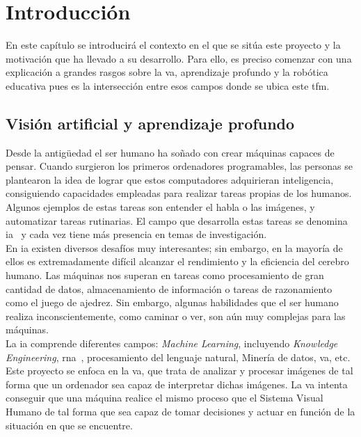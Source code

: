 \chapter{Introducción}\label{cap.introduccion}
En este capítulo se introducirá el contexto en el que se sitúa este proyecto y la motivación que ha llevado a su desarrollo. Para ello, es preciso comenzar con una
explicación a grandes rasgos sobre la \acrfull{va}, aprendizaje profundo y la robótica educativa pues es la intersección entre esos campos donde se ubica este \acrfull{tfm}.
\section{Visión artificial y aprendizaje profundo}

Desde la antigüedad el ser humano ha soñado con crear máquinas capaces de pensar. Cuando surgieron los primeros ordenadores programables, las personas se plantearon la idea de lograr que estos computadores adquirieran inteligencia, consiguiendo capacidades empleadas para realizar tareas propias de los humanos. Algunos ejemplos de estas tareas son entender el habla o las imágenes, y automatizar tareas rutinarias. El campo que desarrolla estas tareas se denomina \acrfull{ia}~\cite{Goodfellow} y cada vez tiene más presencia en temas de investigación.\\

En \acrshort{ia} existen diversos desafíos muy interesantes; sin embargo, en la mayoría de ellos es extremadamente difícil alcanzar el rendimiento y la eficiencia del cerebro humano. Las máquinas nos superan en tareas como procesamiento de gran cantidad de datos, almacenamiento de información o tareas de razonamiento como el juego de ajedrez. Sin embargo, algunas habilidades que el ser humano realiza inconscientemente, como caminar o ver, son aún muy complejas para las máquinas.\\

La \acrshort{ia} comprende diferentes campos: \textit{Machine Learning}, incluyendo \textit{Knowledge Engineering}, \acrfull{rna}~\cite{rna}, procesamiento del lenguaje natural, Minería de datos, \acrfull{va}, etc. Este proyecto se enfoca en la \acrshort{va}, que trata de analizar y procesar imágenes de tal forma que un ordenador sea capaz de interpretar dichas imágenes. La \acrshort{va} intenta conseguir que una máquina realice el mismo proceso que el Sistema Visual Humano de tal forma que sea capaz de tomar decisiones y actuar en función de la situación en que se encuentre.\\


